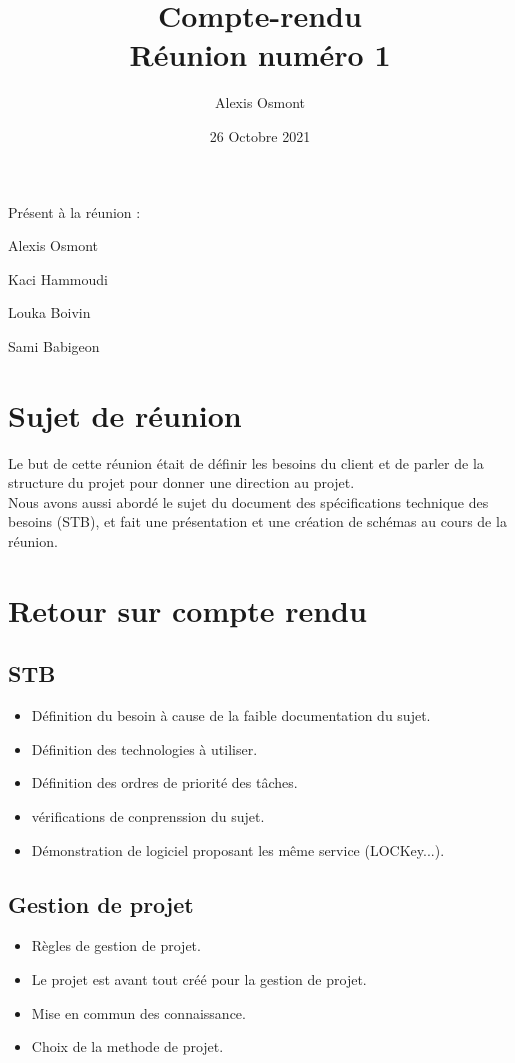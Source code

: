 \documentclass{article}
\title{
    \Huge
    Compte-rendu\\
    Réunion numéro 1\\
}
\date{\huge 26 Octobre 2021}
\author{\huge Alexis Osmont\\}
\begin{document}
\maketitle
\vspace{5cm}
    Présent à la réunion :
    \begin{description}
        \item Alexis Osmont
        \item Kaci Hammoudi
        \item Louka  Boivin
        \item Sami Babigeon
    \end{description}
\newpage

\section{Sujet de réunion}                                                                                 

Le but de cette réunion était de définir les besoins du client et de parler de la structure du projet pour donner une direction au projet.\\

Nous avons aussi abordé le sujet du document des spécifications technique des besoins (STB), et fait une présentation et une création de schémas au cours de la réunion.
\vspace{0.5cm}

\section{Retour sur compte rendu}
\subsection{STB}

\begin{itemize}
    \item Définition du besoin à cause de la faible documentation du sujet.
    \item Définition des technologies à utiliser.
    \item Définition des ordres de priorité des tâches.
    \item vérifications de conprenssion du sujet.
    \item Démonstration de logiciel proposant les même service (LOCKey...).
\end{itemize}

\subsection{Gestion de projet}
\begin{itemize}
    \item Règles de gestion de projet.
    \item Le projet est avant tout créé pour la gestion de projet.
    \item Mise en commun des connaissance.
    \item Choix de la methode de projet.

\end{itemize}
\end{document}
